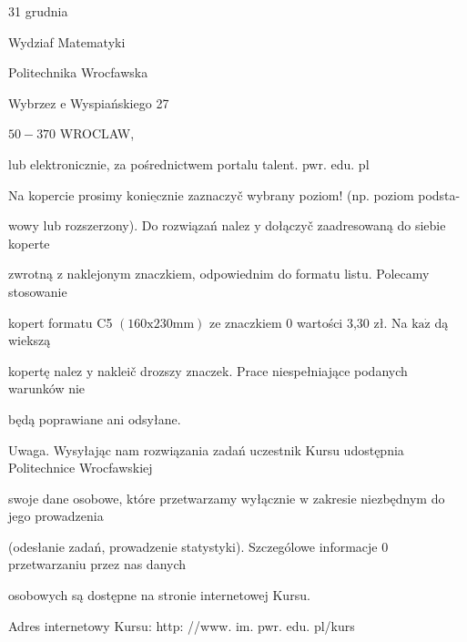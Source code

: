 \documentclass[a4paper,12pt]{article}
\begin{document}
31 grudnia

Wydziaf Matematyki

Politechnika Wrocfawska

Wybrzez $\mathrm{e}$ Wyspiańskiego 27

$50-370$ WROCLAW,

lub elektronicznie, za pośrednictwem portalu talent. pwr. edu. pl

Na kopercie prosimy $\underline{\mathrm{k}\mathrm{o}\mathrm{n}\mathrm{i}\mathrm{e}\mathrm{c}\mathrm{z}\mathrm{n}\mathrm{i}\mathrm{e}}$ zaznaczyč wybrany poziom! (np. poziom podsta-

wowy lub rozszerzony). Do rozwiązań nalez $\mathrm{y}$ dołączyč zaadresowaną do siebie koperte

zwrotną $\mathrm{z}$ naklejonym znaczkiem, odpowiednim do formatu listu. Polecamy stosowanie

kopert formatu C5 $(160\mathrm{x}230\mathrm{m}\mathrm{m})$ ze znaczkiem $0$ wartości 3,30 zł. Na $\mathrm{k}\mathrm{a}\dot{\mathrm{z}}$ dą wiekszą

kopertę nalez $\mathrm{y}$ nakleič drozszy znaczek. Prace niespełniające podanych warunków nie

będą poprawiane ani odsyłane.

Uwaga. Wysyłając nam rozwiązania zadań uczestnik Kursu udostępnia Politechnice Wrocfawskiej

swoje dane osobowe, które przetwarzamy wyłącznie $\mathrm{w}$ zakresie niezbędnym do jego prowadzenia

(odesłanie zadań, prowadzenie statystyki). Szczególowe informacje $0$ przetwarzaniu przez nas danych

osobowych są dostępne na stronie internetowej Kursu.

Adres internetowy Kursu: http: //www. im. pwr. edu. pl/kurs
\end{document}
